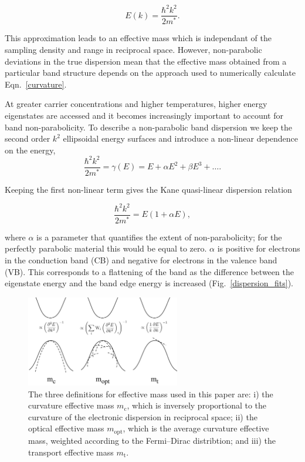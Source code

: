 \begin{equation} \label{parabolic}
E(k)= \frac{\hbar^2k^2}{2m^*}.
\end{equation}

This approximation leads to an effective mass which is independant of the sampling density and range in reciprocal space.
However, non-parabolic deviations in the true dispersion mean that the effective mass obtained from a particular band structure depends on the approach used to numerically calculate Eqn.\ \ref{curvature}. 

At greater carrier concentrations and higher temperatures, higher energy eigenstates are accessed and it becomes increasingly important to account for band non-parabolicity.\autocite{Ruf1990} 
To describe a non-parabolic band dispersion we keep the second order $k^2$ ellipsoidal energy surfaces and introduce a non-linear dependence on the energy, 
\begin{equation} \label{nonparabolic}
\frac{\hbar^2k^2}{2m^*} = \gamma(E) = E + \alpha E^2 + \beta E^3+ \ldots .
\end{equation}

Keeping the first non-linear term gives the Kane quasi-linear dispersion relation\autocite{Kane1957}

\begin{equation} \label{kane}
\frac{\hbar^2k^2}{2m^*} = E(1 + \alpha E),
\end{equation}

where $\alpha$ is a parameter that quantifies the extent of non-parabolicity; for the perfectly parabolic material this would be equal to zero. 
$\alpha$ is positive for electrons in the conduction band (CB) and negative for electrons in the valence band (VB). 
This corresponds to a flattening of the band as the difference between the eigenstate energy and the band edge energy is increased (Fig.\ \ref{dispersion_fits}).

\begin{figure}[tb] \centering
\includegraphics[width=0.6\textwidth]{./figures/ch4/effmass_schematic.pdf}
\caption[Schematic outlining three definitions of effective mass]{\label{effmass_schematic} The three definitions for effective mass used in this paper are: i) the curvature effective mass $m_{\text{c}}$, which is inversely proportional to the curvature of the electronic dispersion in reciprocal space; ii) the optical effective mass $m_{\text{opt}}$, which is the average curvature effective mass, weighted according to the Fermi--Dirac distribtion; and iii) the transport effective mass $m_{\text{t}}$. }
\end{figure}

